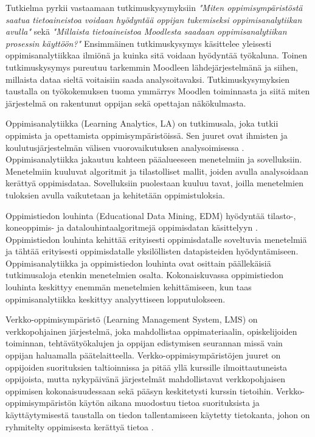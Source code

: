 Tutkielma pyrkii vastaamaan tutkimuskysymyksiin \emph{"Miten oppimisympäristöstä saatua tietoaineistoa voidaan hyödyntää oppijan tukemiseksi oppimisanalytiikan avulla"} sekä \emph{"Millaista tietoaineistoa Moodlesta saadaan oppimisanalytiikan prosessin käyttöön?"} Ensimmäinen tutkimuskysymys käsittelee yleisesti oppimisanalytiikkaa ilmiönä ja kuinka sitä voidaan hyödyntää työkaluna. Toinen tutkimuskysymys pureutuu tarkemmin Moodleen lähdejärjestelmänä ja siihen, millaista dataa sieltä voitaisiin saada analysoitavaksi. Tutkimuskysymyksien taustalla on työkokemuksen tuoma ymmärrys Moodlen toiminnasta ja siitä miten järjestelmä on rakentunut oppijan sekä opettajan näkökulmasta.

Oppimisanalytiikka (Learning Analytics, LA) \citep{longPenetratingFogAnalytics2011} on tutkimusala, joka tutkii oppimista ja opettamista oppimisympäristöissä. Sen juuret ovat ihmisten ja koulutusjärjestelmän välisen vuorovaikutuksen analysoimisessa \citep{siemensLearningAnalyticsEmergence2013}. Oppimisanalytiikka jakautuu kahteen pääalueeseen menetelmiin ja sovelluksiin. Menetelmiin kuuluvat algoritmit ja tilastolliset mallit, joiden avulla analysoidaan kerättyä oppimisdataa. Sovelluksiin puolestaan kuuluu tavat, joilla menetelmien tuloksien avulla vaikutetaan ja kehitetään oppimistuloksia.

Oppimistiedon louhinta (Educational Data Mining, EDM) hyödyntää tilasto-, koneoppimis- ja datalouhintaalgoritmejä oppimisdatan käsittelyyn \citep{romeroEducationalDataMining2010,siemensLearningAnalyticsEmergence2013}. Oppimistiedon louhinta kehittää erityisesti oppimisdatalle soveltuvia menetelmiä ja tähtää erityisesti oppimisdatalle yksilöllisten datapisteiden hyödyntämiseen. Oppimisanalytiikka ja oppimistiedon louhinta ovat osittain päällekäisiä tutkimusaloja etenkin menetelmien osalta. Kokonaiskuvassa oppimistiedon louhinta keskittyy enemmän menetelmien kehittämiseen, kun taas oppimisanalytiikka keskittyy analyyttiseen lopputulokseen.

Verkko-oppimisympäristö (Learning Management System, LMS) on verkkopohjainen järjestelmä, joka mahdollistaa oppimateriaalin, opiskelijoiden toiminnan, tehtävätyökalujen ja oppijan edistymisen seurannan \citep{mohdChoosingRightLearning2016} missä vain oppijan haluamalla päätelaitteella. Verkko-oppimisympäristöjen juuret on oppijoiden suorituksien taltioinnissa ja pitää yllä kurssille ilmoittautuneista oppijoista, mutta nykypäivänä järjestelmät mahdollistavat verkkopohjaisen oppimisen kokonaisuudessaan sekä pääsyn keskitetysti kurssin tietoihin. Verkko-oppimisympäristön käytön aikana muodostuu tietoa suorituksista ja käyttäytymisestä taustalla on tiedon tallentamiseen käytetty tietokanta, johon on ryhmitelty oppimisesta kerättyä tietoa \citep{romeroSurveyPreProcessingEducational2014}.
